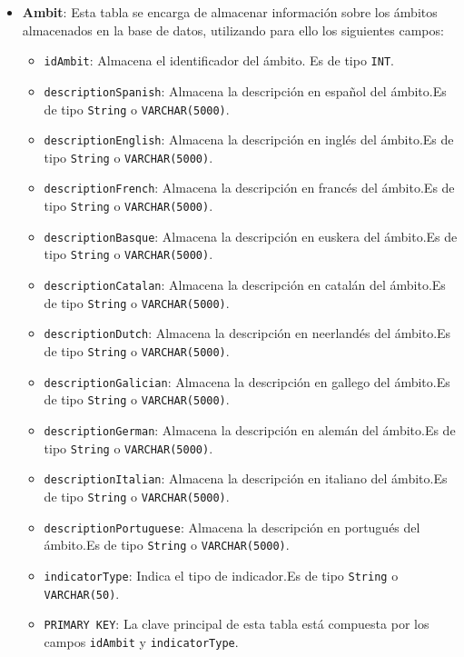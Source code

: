 \begin{itemize}
    \item \textbf{Ambit}: Esta tabla se encarga de almacenar información sobre los ámbitos almacenados en la base de datos, utilizando para ello los siguientes campos:
        \begin{itemize}
        \item \texttt{idAmbit}: Almacena el identificador del ámbito. Es de tipo \texttt{INT}.
        \item \texttt{descriptionSpanish}: Almacena la descripción en español del ámbito.Es de tipo \texttt{String} o \texttt{VARCHAR(5000)}.
        \item \texttt{descriptionEnglish}: Almacena la descripción en inglés del ámbito.Es de tipo \texttt{String} o \texttt{VARCHAR(5000)}.
        \item \texttt{descriptionFrench}: Almacena la descripción en francés del ámbito.Es de tipo \texttt{String} o \texttt{VARCHAR(5000)}.
        \item \texttt{descriptionBasque}: Almacena la descripción en euskera del ámbito.Es de tipo \texttt{String} o \texttt{VARCHAR(5000)}.
        \item \texttt{descriptionCatalan}: Almacena la descripción en catalán del ámbito.Es de tipo \texttt{String} o \texttt{VARCHAR(5000)}.
        \item \texttt{descriptionDutch}: Almacena la descripción en neerlandés del ámbito.Es de tipo \texttt{String} o \texttt{VARCHAR(5000)}.
        \item \texttt{descriptionGalician}: Almacena la descripción en gallego del ámbito.Es de tipo \texttt{String} o \texttt{VARCHAR(5000)}.
        \item \texttt{descriptionGerman}: Almacena la descripción en alemán del ámbito.Es de tipo \texttt{String} o \texttt{VARCHAR(5000)}.
        \item \texttt{descriptionItalian}: Almacena la descripción en italiano del ámbito.Es de tipo \texttt{String} o \texttt{VARCHAR(5000)}.
        \item \texttt{descriptionPortuguese}: Almacena la descripción en portugués del ámbito.Es de tipo \texttt{String} o \texttt{VARCHAR(5000)}.
        \item \texttt{indicatorType}: Indica el tipo de indicador.Es de tipo \texttt{String} o \texttt{VARCHAR(50)}.
        \item \texttt{PRIMARY KEY}: La clave principal de esta tabla está compuesta por los campos  \texttt{idAmbit} y \texttt{indicatorType}.
        \end{itemize}
    

\end{itemize}
